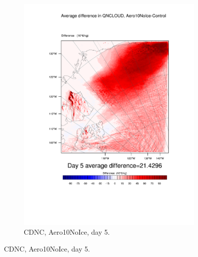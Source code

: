 \begin{figure}[hb]
\begin{subfigure}{0.48\textwidth}
		\includegraphics[width=\textwidth]{results/aero10ni/diff_Aero10NoIce_QNCLOUD_Day5.pdf}
		\caption{CDNC, Aero10NoIce, day 5.}
		\label{subfig:CDNCr4Day5}
	\end{subfigure}
	

\end{figure}
